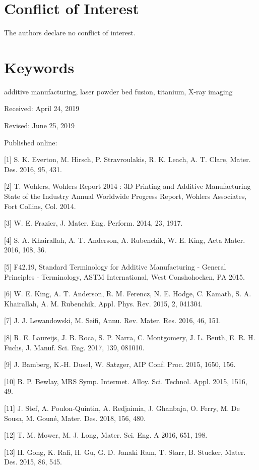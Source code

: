 \documentclass[10pt]{article}
\begin{document}
\section*{Conflict of Interest}
The authors declare no conflict of interest.

\section*{Keywords}
additive manufacturing, laser powder bed fusion, titanium, $\mathrm{X}$-ray imaging

Received: April 24, 2019

Revised: June 25, 2019

Published online:

[1] S. K. Everton, M. Hirsch, P. Stravroulakis, R. K. Leach, A. T. Clare, Mater. Des. 2016, 95, 431.

[2] T. Wohlers, Wohlers Report 2014 : 3D Printing and Additive Manufacturing State of the Industry Annual Worldwide Progress Report, Wohlers Associates, Fort Collins, Col. 2014.

[3] W. E. Frazier, J. Mater. Eng. Perform. 2014, 23, 1917.

[4] S. A. Khairallah, A. T. Anderson, A. Rubenchik, W. E. King, Acta Mater. 2016, 108, 36.

[5] F42.19, Standard Terminology for Additive Manufacturing - General Principles - Terminology, ASTM International, West Conshohocken, PA 2015.

[6] W. E. King, A. T. Anderson, R. M. Ferencz, N. E. Hodge, C. Kamath, S. A. Khairallah, A. M. Rubenchik, Appl. Phys. Rev. 2015, 2, 041304.

[7] J. J. Lewandowski, M. Seifi, Annu. Rev. Mater. Res. 2016, 46, 151.

[8] R. E. Laureijs, J. B. Roca, S. P. Narra, C. Montgomery, J. L. Beuth, E. R. H. Fuchs, J. Manuf. Sci. Eng. 2017, 139, 081010.

[9] J. Bamberg, K.-H. Dusel, W. Satzger, AIP Conf. Proc. 2015, 1650, 156.

[10] B. P. Bewlay, MRS Symp. Intermet. Alloy. Sci. Technol. Appl. 2015, 1516, 49.

[11] J. Stef, A. Poulon-Quintin, A. Redjaimia, J. Ghanbaja, O. Ferry, M. De Sousa, M. Gouné, Mater. Des. 2018, 156, 480.

[12] T. M. Mower, M. J. Long, Mater. Sci. Eng. A 2016, 651, 198.

[13] H. Gong, K. Rafi, H. Gu, G. D. Janaki Ram, T. Starr, B. Stucker, Mater. Des. 2015, 86, 545.
\end{document}
